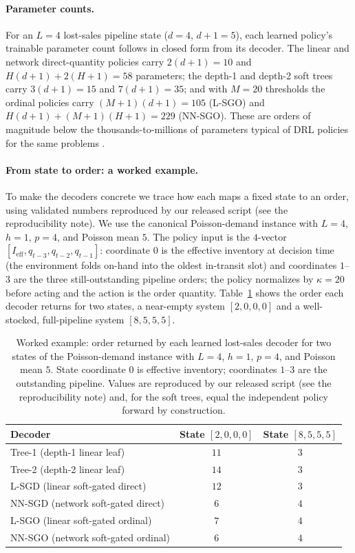 \documentclass[11pt]{article}
\begin{document}
\paragraph{Parameter counts.}
For an $L=4$ lost-sales pipeline state ($d=4$, $d+1=5$), each learned policy's trainable parameter
count follows in closed form from its decoder. The linear and network direct-quantity policies carry
$2(d+1)=10$ and $H(d+1)+2(H+1)=58$ parameters; the depth-1 and depth-2 soft trees carry $3(d+1)=15$
and $7(d+1)=35$; and with $M=20$ thresholds the ordinal policies carry $(M+1)(d+1)=105$ (L-SGO) and
$H(d+1)+(M+1)(H+1)=229$ (NN-SGO). These are orders of magnitude below the thousands-to-millions of
parameters typical of DRL policies for the same problems \citep{gijsbrechts2022drl,kaynov2024owmr}.

\paragraph{From state to order: a worked example.}
To make the decoders concrete we trace how each maps a fixed state to an order, using validated
numbers reproduced by our released script (see the reproducibility note). We use the
canonical Poisson-demand instance with $L=4$, $h=1$, $p=4$, and Poisson mean $5$. The policy
input is the $4$-vector $[I_{\mathrm{eff}},q_{t-3},q_{t-2},q_{t-1}]$: coordinate $0$ is the effective
inventory at decision time (the environment folds on-hand into the oldest in-transit slot) and
coordinates $1$--$3$ are the three still-outstanding pipeline orders; the policy normalizes by
$\kappa=20$ before acting and the action is the order quantity. Table~\ref{tab:worked}
shows the order each decoder returns for two states, a near-empty system $[2,0,0,0]$ and a
well-stocked, full-pipeline system $[8,5,5,5]$.

\begin{table}[!htbp]
\centering
\small
\caption{Worked example: order returned by each learned lost-sales decoder for two states of the
Poisson-demand instance with $L=4$, $h=1$, $p=4$, and Poisson mean $5$. State coordinate $0$
is effective inventory; coordinates $1$--$3$ are the outstanding pipeline. Values are reproduced by
our released script (see the reproducibility note) and, for the soft trees, equal the independent
policy forward by construction.}
\label{tab:worked}
\begin{tabular}{lcc}
\toprule
Decoder & State $[2,0,0,0]$ & State $[8,5,5,5]$ \\
\midrule
Tree-1 (depth-1 linear leaf) & $11$ & $3$ \\
Tree-2 (depth-2 linear leaf) & $14$ & $3$ \\
L-SGD (linear soft-gated direct) & $12$ & $3$ \\
NN-SGD (network soft-gated direct) & $6$ & $4$ \\
L-SGO (linear soft-gated ordinal) & $7$ & $4$ \\
NN-SGO (network soft-gated ordinal) & $6$ & $4$ \\
\bottomrule
\end{tabular}
\end{table}
\FloatBarrier
\end{document}
